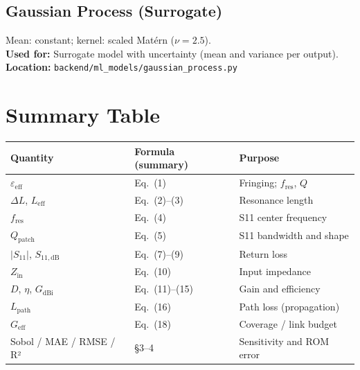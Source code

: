 \documentclass[11pt,a4paper]{article}
\begin{document}
\subsection{Gaussian Process (Surrogate)}
Mean: constant; kernel: scaled Matérn (\(\nu = 2.5\)). \\
\textbf{Used for:} Surrogate model with uncertainty (mean and variance per output). \\
\textbf{Location:} \texttt{backend/ml\_models/gaussian\_process.py}

\section{Summary Table}

\begin{center}
\begin{tabular}{@{}lll@{}}
\toprule
\textbf{Quantity} & \textbf{Formula (summary)} & \textbf{Purpose} \\
\midrule
\(\varepsilon_{\mathrm{eff}}\) & Eq.\ (1) & Fringing; \(f_{\mathrm{res}}\), \(Q\) \\
\(\Delta L\), \(L_{\mathrm{eff}}\) & Eq.\ (2)--(3) & Resonance length \\
\(f_{\mathrm{res}}\) & Eq.\ (4) & S11 center frequency \\
\(Q_{\mathrm{patch}}\) & Eq.\ (5) & S11 bandwidth and shape \\
\(|S_{11}|\), \(S_{11,\mathrm{dB}}\) & Eq.\ (7)--(9) & Return loss \\
\(Z_{\mathrm{in}}\) & Eq.\ (10) & Input impedance \\
\(D\), \(\eta\), \(G_{\mathrm{dBi}}\) & Eq.\ (11)--(15) & Gain and efficiency \\
\(L_{\mathrm{path}}\) & Eq.\ (16) & Path loss (propagation) \\
\(G_{\mathrm{eff}}\) & Eq.\ (18) & Coverage / link budget \\
Sobol / MAE / RMSE / R² & §3--4 & Sensitivity and ROM error \\
\bottomrule
\end{tabular}
\end{center}
\end{document}
